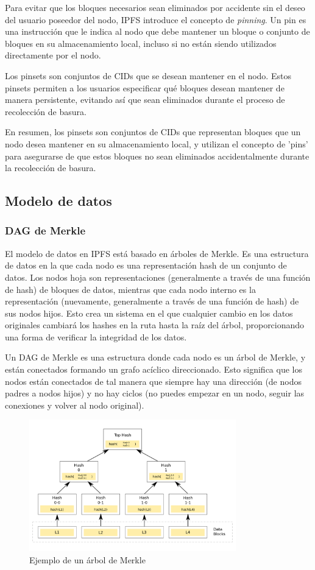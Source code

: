 Para evitar que los bloques necesarios sean eliminados por accidente sin el deseo del usuario poseedor del nodo, IPFS introduce el concepto de \textit{pinning}. Un pin es una
instrucción que le indica al nodo que debe mantener un bloque o conjunto de bloques en su almacenamiento local, incluso si no están
siendo utilizados directamente por el nodo.

Los pinsets son conjuntos de CIDs que se desean mantener en el nodo. Estos pinsets permiten a los usuarios
especificar qué bloques desean mantener de manera persistente, evitando así que sean eliminados durante el proceso de
recolección de basura.

En resumen, los pinsets son conjuntos de CIDs que representan bloques que un nodo desea mantener en su almacenamiento local, y utilizan el concepto de 'pins' para asegurarse de que estos bloques no sean eliminados accidentalmente durante la recolección de basura.

\subsection{Modelo de datos}\label{sect:modelo-de-datos}
\subsubsection{DAG de Merkle}
El modelo de datos en IPFS está basado en árboles de Merkle. Es una estructura de datos en la que cada nodo es una representación hash de un conjunto de datos.
Los nodos hoja son representaciones (generalmente a través de una función de hash) de bloques de datos, mientras que cada nodo interno es la representación
(nuevamente, generalmente a través de una función de hash) de sus nodos hijos. Esto crea un sistema en el que cualquier cambio en los datos originales cambiará
los hashes en la ruta hasta la raíz del árbol, proporcionando una forma de verificar la integridad de los datos.

Un DAG de Merkle es una estructura donde cada nodo es un árbol de Merkle, y están conectados formando un grafo acíclico direccionado.
Esto significa que los nodos están conectados de tal manera que siempre hay una dirección (de nodos padres a nodos hijos) y no hay ciclos (no puedes empezar en un nodo, seguir las conexiones y volver al nodo original).

\begin{figure}[H]
      \centering
      \includegraphics[width=0.8\textwidth]{images/merkledag.png}
      \caption{Ejemplo de un árbol de Merkle}
      \label{merkledag}
\end{figure}

